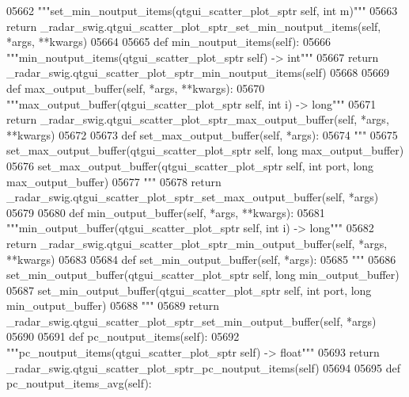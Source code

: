 \begin{DoxyCode}
{{{{{{{{{{{{{{{{{{{05662         \textcolor{stringliteral}{"""set\_min\_noutput\_items(qtgui\_scatter\_plot\_sptr self, int m)"""}
05663         \textcolor{keywordflow}{return} \_radar\_swig.qtgui\_scatter\_plot\_sptr\_set\_min\_noutput\_items(self, *args, **kwargs)
05664 
05665     \textcolor{keyword}{def }min_noutput_items(self):
05666         \textcolor{stringliteral}{"""min\_noutput\_items(qtgui\_scatter\_plot\_sptr self) -> int"""}
05667         \textcolor{keywordflow}{return} \_radar\_swig.qtgui\_scatter\_plot\_sptr\_min\_noutput\_items(self)
05668 
05669     \textcolor{keyword}{def }max_output_buffer(self, *args, **kwargs):
05670         \textcolor{stringliteral}{"""max\_output\_buffer(qtgui\_scatter\_plot\_sptr self, int i) -> long"""}
05671         \textcolor{keywordflow}{return} \_radar\_swig.qtgui\_scatter\_plot\_sptr\_max\_output\_buffer(self, *args, **kwargs)
05672 
05673     \textcolor{keyword}{def }set_max_output_buffer(self, *args):
05674         \textcolor{stringliteral}{"""}
05675 \textcolor{stringliteral}{        set\_max\_output\_buffer(qtgui\_scatter\_plot\_sptr self, long max\_output\_buffer)}
05676 \textcolor{stringliteral}{        set\_max\_output\_buffer(qtgui\_scatter\_plot\_sptr self, int port, long max\_output\_buffer)}
05677 \textcolor{stringliteral}{        """}
05678         \textcolor{keywordflow}{return} \_radar\_swig.qtgui\_scatter\_plot\_sptr\_set\_max\_output\_buffer(self, *args)
05679 
05680     \textcolor{keyword}{def }min_output_buffer(self, *args, **kwargs):
05681         \textcolor{stringliteral}{"""min\_output\_buffer(qtgui\_scatter\_plot\_sptr self, int i) -> long"""}
05682         \textcolor{keywordflow}{return} \_radar\_swig.qtgui\_scatter\_plot\_sptr\_min\_output\_buffer(self, *args, **kwargs)
05683 
05684     \textcolor{keyword}{def }set_min_output_buffer(self, *args):
05685         \textcolor{stringliteral}{"""}
05686 \textcolor{stringliteral}{        set\_min\_output\_buffer(qtgui\_scatter\_plot\_sptr self, long min\_output\_buffer)}
05687 \textcolor{stringliteral}{        set\_min\_output\_buffer(qtgui\_scatter\_plot\_sptr self, int port, long min\_output\_buffer)}
05688 \textcolor{stringliteral}{        """}
05689         \textcolor{keywordflow}{return} \_radar\_swig.qtgui\_scatter\_plot\_sptr\_set\_min\_output\_buffer(self, *args)
05690 
05691     \textcolor{keyword}{def }pc_noutput_items(self):
05692         \textcolor{stringliteral}{"""pc\_noutput\_items(qtgui\_scatter\_plot\_sptr self) -> float"""}
05693         \textcolor{keywordflow}{return} \_radar\_swig.qtgui\_scatter\_plot\_sptr\_pc\_noutput\_items(self)
05694 
05695     \textcolor{keyword}{def }pc_noutput_items_avg(self):
}}}}}}}}}}}}}}}}}}}
\end{DoxyCode}
